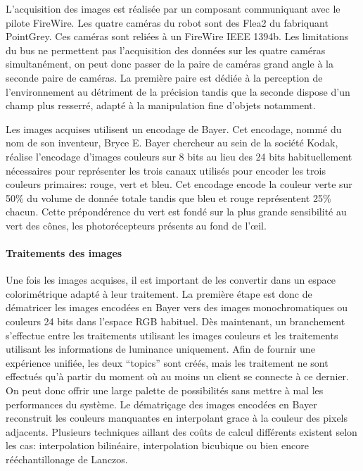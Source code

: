 L'acquisition des images est réalisée par un composant communiquant
avec le pilote FireWire. Les quatre caméras du robot sont des Flea2 du
fabriquant PointGrey. Ces caméras sont reliées à un FireWire IEEE
1394b. Les limitations du bus ne permettent
pas l'acquisition des données sur les quatre caméras simultanément, on
peut donc passer de la paire de caméras grand angle à la seconde paire
de caméras. La première paire est dédiée à la perception de
l'environnement au détriment de la précision tandis que la seconde
dispose d'un champ plus resserré, adapté à la manipulation fine
d'objets notamment.

Les images acquises utilisent un encodage de Bayer. Cet encodage, nommé du nom de son inventeur, Bryce
E. Bayer chercheur au sein de la société Kodak, réalise l'encodage
d'images couleurs sur 8 bits au lieu des 24 bits habituellement
nécessaires pour représenter les trois canaux utilisés pour encoder
les trois couleurs primaires: rouge, vert et bleu. Cet encodage encode
la couleur verte sur 50\% du volume de donnée totale tandis que bleu
et rouge représentent 25\% chacun. Cette prépondérence du vert est
fondé sur la plus grande sensibilité au vert des cônes, les
photorécepteurs présents au fond de l'\oe il.


\paragraph{Traitements des images}

Une fois les images acquises, il est important de les convertir dans
un espace colorimétrique adapté à leur
traitement. La première étape est donc de dématricer les images
encodées en Bayer vers des images monochromatiques ou couleurs 24 bits
dans l'espace RGB habituel. Dès maintenant, un branchement s'effectue
entre les traitements utilisant les images couleurs et les traitements
utilisant les informations de luminance uniquement. Afin de fournir
une expérience unifiée, les deux ``topics'' sont créés, mais les
traitement ne sont effectués qu'à partir du moment où au moins un
client se connecte à ce dernier. On peut donc offrir une large palette
de possibilités sans mettre à mal les performances du système. Le
dématriçage des images encodées en Bayer
reconstruit les couleurs manquantes en interpolant grace à la couleur
des pixels adjacents. Plusieurs techniques aillant des coûts de calcul
différents existent selon les cas: interpolation bilinéaire,
interpolation bicubique ou bien encore rééchantillonage de
Lanczos.


